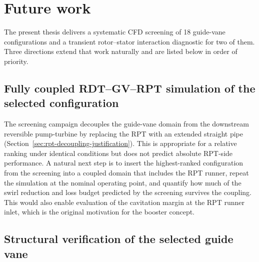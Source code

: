 \chapter{Future work}
\label{chap:chap7}

The present thesis delivers a systematic CFD screening of 18 guide-vane configurations and a transient rotor--stator interaction diagnostic for two of them. Three directions extend that work naturally and are listed below in order of priority.

\section*{Fully coupled RDT--GV--RPT simulation of the selected configuration}

The screening campaign decouples the guide-vane domain from the downstream reversible pump-turbine by replacing the RPT with an extended straight pipe (Section~\ref{sec:rpt-decoupling-justification}). This is appropriate for a relative ranking under identical conditions but does not predict absolute RPT-side performance. A natural next step is to insert the highest-ranked configuration from the screening into a coupled domain that includes the RPT runner, repeat the simulation at the nominal operating point, and quantify how much of the swirl reduction and loss budget predicted by the screening survives the coupling. This would also enable evaluation of the cavitation margin at the RPT runner inlet, which is the original motivation for the booster concept.

\section*{Structural verification of the selected guide vane}

